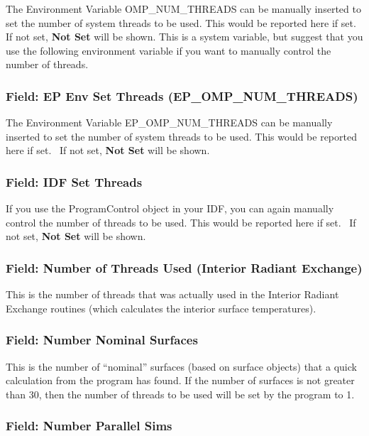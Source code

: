 The Environment Variable OMP\_NUM\_THREADS can be manually inserted to set the number of system threads to be used. This would be reported here if set.~ If not set, \textbf{Not Set} will be shown. This is a system variable, but suggest that you use the following environment variable if you want to manually control the number of threads.

\subsubsection{Field: EP Env Set Threads (EP\_OMP\_NUM\_THREADS)}\label{field-ep-env-set-threads-epux5fompux5fnumux5fthreads}

The Environment Variable EP\_OMP\_NUM\_THREADS can be manually inserted to set the number of system threads to be used. This would be reported here if set.~ If not set, \textbf{Not Set} will be shown.

\subsubsection{Field: IDF Set Threads}\label{field-idf-set-threads}

If you use the ProgramControl object in your IDF, you can again manually control the number of threads to be used. This would be reported here if set.~ If not set, \textbf{Not Set} will be shown.

\subsubsection{Field: Number of Threads Used (Interior Radiant Exchange)}\label{field-number-of-threads-used-interior-radiant-exchange}

This is the number of threads that was actually used in the Interior Radiant Exchange routines (which calculates the interior surface temperatures).

\subsubsection{Field: Number Nominal Surfaces}\label{field-number-nominal-surfaces}

This is the number of ``nominal'' surfaces (based on surface objects) that a quick calculation from the program has found. If the number of surfaces is not greater than 30, then the number of threads to be used will be set by the program to 1.

\subsubsection{Field: Number Parallel Sims}\label{field-number-parallel-sims}

